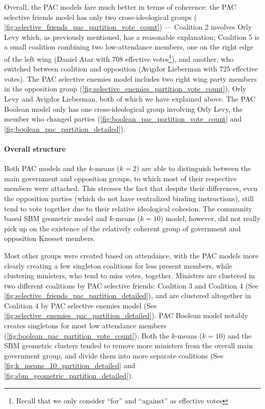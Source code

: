 Overall, the PAC models fare much better in terms of coherence:
the PAC selective friends model has only two cross-ideological groups (
\autoref{fig:selective_friends_pac_partition_vote_count}) ---
Coalition 2 involves Orly Levy which, as previously mentioned, has a reasonable
explanation; Coalition 5 is a small coalition combining two low-attendance
members, one on the right edge of the left wing (Daniel Atar with 708 effective
votes\footnote{Recall that we only consider ``for'' and ``against'' as
effective votes}), and another, who switched between coalition and opposition
\cite{knesset:lieberman, wiki:lieberman} (Avigdor Lieberman with 725 effective
votes).
The PAC selective enemies model includes two right wing party members in the
opposition group (\autoref{fig:selective_enemies_partition_vote_count}),
Orly Levy and Avigdor Lieberman, both of which we have explained above.
The PAC Boolean model only has one cross-ideological group involving Orly Levy,
the member who changed parties (\autoref{fig:boolean_pac_partition_vote_count}
and \autoref{fig:boolean_pac_partition_detailed}).

\paragraph{Overall structure}
Both PAC models and the $k$-means ($k=2$) are able to distinguish between the
main government and opposition groups, to which most of their respective
members were attached.
This stresses the fact that despite their differences, even the opposition
parties (which do not have centralized binding instructions), still tend to
vote together due to their relative ideological cohesion.
The community based SBM geometric model and $k$-means ($k=10$) model, however,
did not really pick up on the existence of the relatively coherent group of
government and opposition Knesset members.

Most other groups were created based on attendance, with the PAC models more
clearly creating a few singleton coalitions for less present members, while
clustering ministers, who tend to miss votes, together.
Ministers are clustered in two different coalitions by PAC selective friends:
Coalition 3 and Coalition 4
(See \autoref{fig:selective_friends_pac_partition_detailed}), and are clustered
altogether in Coalition 4 by PAC selective enemies model (See
\autoref{fig:selective_enemies_pac_partition_detailed}).
PAC Boolean model notably creates singletons for most low attendance members
(\autoref{fig:boolean_pac_partition_vote_count}).
Both the $k$-means ($k=10$) and the SBM geometric clusters tended to remove
more ministers from the overall main government group, and divide them into
more separate coalitions (See \autoref{fig:k_means_10_partition_detailed} and 
\autoref{fig:sbm_geometric_partition_detailed}).

